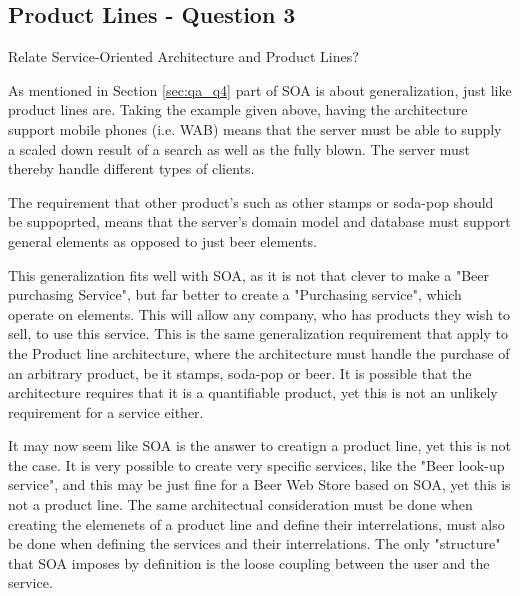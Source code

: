 \subsection{Product Lines - Question 3}

\begin{question}
Relate Service-Oriented Architecture and Product Lines?
\end{question}

As mentioned in Section \ref{sec:qa_q4} part of SOA is about generalization, just like product lines are. Taking the example given above, having the architecture support mobile phones (i.e. WAB) means that the server must be able to supply a scaled down result of a search as well as the fully blown. The server must thereby handle different types of clients.

The requirement that other product's such as other stamps or soda-pop should be suppoprted, means that the server's domain model and database must support general elements as opposed to just beer elements.

This generalization fits well with SOA, as it is not that clever to make a "Beer purchasing Service", but far better to create a "Purchasing service", which operate on elements. This will allow any company, who has products they wish to sell, to use this service. This is the same generalization requirement that apply to the Product line architecture, where the architecture must handle the purchase of an arbitrary product, be it stamps, soda-pop or beer. It is possible that the architecture requires that it is a quantifiable product, yet this is not an unlikely requirement for a service either.

It may now seem like SOA is the answer to creatign a product line, yet this is not the case. It is very possible to create very specific services, like the "Beer look-up service", and this may be just fine for a Beer Web Store based on SOA, yet this is not a product line. The same architectual consideration must be done when creating the elemenets of a product line and define their interrelations, must also be done when defining the services and their interrelations. The only "structure" that SOA imposes by definition is the loose coupling between the user and the service.
